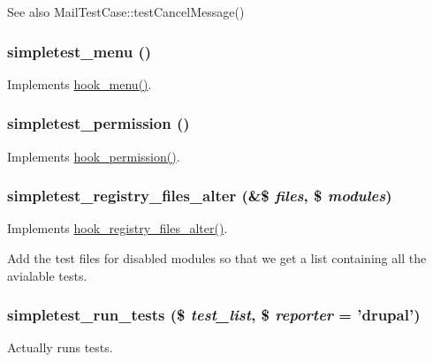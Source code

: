 \begin{DoxySeeAlso}{See also}
MailTestCase::testCancelMessage() 
\end{DoxySeeAlso}
\hypertarget{simpletest_8module_a4b53dcaeb636c73dbbc1fc974daf311a}{
\subsubsection[{simpletest\_\-menu}]{\setlength{\rightskip}{0pt plus 5cm}simpletest\_\-menu ()}}
\label{simpletest_8module_a4b53dcaeb636c73dbbc1fc974daf311a}
Implements \hyperlink{group__hooks_ga5c95244fea59b25666e409759e133ded}{hook\_\-menu()}. \hypertarget{simpletest_8module_a48c805a2603f0f4ec321d406df350e33}{
\subsubsection[{simpletest\_\-permission}]{\setlength{\rightskip}{0pt plus 5cm}simpletest\_\-permission ()}}
\label{simpletest_8module_a48c805a2603f0f4ec321d406df350e33}
Implements \hyperlink{group__hooks_ga2b22b45f4925f2478412477bae329713}{hook\_\-permission()}. \hypertarget{simpletest_8module_a00dcdad5c7cce6aba550dfd1e24f6eec}{
\subsubsection[{simpletest\_\-registry\_\-files\_\-alter}]{\setlength{\rightskip}{0pt plus 5cm}simpletest\_\-registry\_\-files\_\-alter (\&\$ {\em files}, \/  \$ {\em modules})}}
\label{simpletest_8module_a00dcdad5c7cce6aba550dfd1e24f6eec}
Implements \hyperlink{group__hooks_ga5b1201bb1afca26333900cd9aca6a2de}{hook\_\-registry\_\-files\_\-alter()}.

Add the test files for disabled modules so that we get a list containing all the avialable tests. \hypertarget{simpletest_8module_aa4d080c3cdac1041179452cffdaa9c39}{
\subsubsection[{simpletest\_\-run\_\-tests}]{\setlength{\rightskip}{0pt plus 5cm}simpletest\_\-run\_\-tests (\$ {\em test\_\-list}, \/  \$ {\em reporter} = {\ttfamily 'drupal'})}}
\label{simpletest_8module_aa4d080c3cdac1041179452cffdaa9c39}
Actually runs tests.


